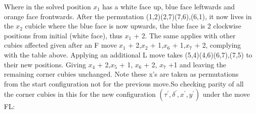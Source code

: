 \documentclass{article}
\begin{document}
\begin{figure}[hbt]
\centering
\RubikCubeSolvedWY
{}
\hspace{.5cm}
%
\hspace{.5cm}
\end{figure}
\begin{figure}[hbt]
\centering
\RubikCubeSolvedWY
{}%
\hspace{.5cm}
\end{figure}
Where in the solved position $x_1$ has a white face up, blue face leftwards and orange face frontwards. After the permutation (1,2)(2,7)(7,6),(6,1), it now lives in the $x_2$ cubicle where the blue face is now upwards, the blue face is 2 clockwise positions from initial (white face), thus $x_1$ + 2. The same applies with other cubies affected given after an F move $x_1$ + 2,$x_2$ + 1,$x_6$ + 1,$x_7$ + 2, complying with the table above. Applying an additional L move takes (5,4)(4,6)(6,7),(7,5) to their new positions. Giving $x_4$ + 2,$x_5$ + 1, $x_6$ + 2, $x_7$ +1 and leaving the remaining corner cubies unchanged. Note these x's are taken as permutations from the start configuration not for the previous move.\newline So checking parity of all the corner cubies in this for the new configuration $(\tau^{'},\delta^{'}, x^{'}, y^{'})$ under the move FL:
\end{document}

